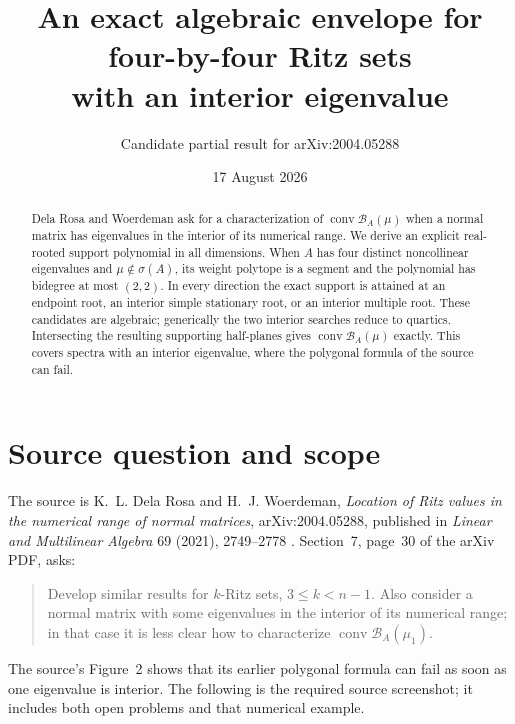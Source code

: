 \documentclass[11pt]{article}
\title{An exact algebraic envelope for four-by-four Ritz sets\\
with an interior eigenvalue}
\author{Candidate partial result for arXiv:2004.05288}
\date{17 August 2026}
\newcommand{\conv}{\operatorname{conv}}
\newcommand{\spec}{\sigma}
\newcommand{\cB}{\mathcal B}
\numberwithin{equation}{section}
\theoremstyle{definition}
\begin{document}
\maketitle

\begin{center}
\end{center}

\begin{abstract}
Dela Rosa and Woerdeman ask for a characterization of
$\conv\cB_A(\mu)$ when a normal matrix has eigenvalues in the interior of its
numerical range.  We derive an explicit real-rooted support polynomial in all
dimensions.  When $A$ has four distinct noncollinear eigenvalues and
$\mu\notin\spec(A)$, its weight polytope is a segment and the polynomial has
bidegree at most $(2,2)$.  In every direction the exact support is attained at
an endpoint root, an interior simple stationary root, or an interior multiple
root.  These candidates are algebraic; generically the two interior searches
reduce to quartics.  Intersecting the resulting supporting half-planes gives
$\conv\cB_A(\mu)$ exactly.  This covers spectra with an interior eigenvalue,
where the polygonal formula of the source can fail.
\end{abstract}

\section{Source question and scope}

The source is K.~L. Dela Rosa and H.~J. Woerdeman, \emph{Location of Ritz
values in the numerical range of normal matrices}, arXiv:2004.05288,
published in \emph{Linear and Multilinear Algebra} 69 (2021), 2749--2778
\cite{DRW-location}.  Section~7, page~30 of the arXiv PDF, asks:

\begin{quote}
Develop similar results for $k$-Ritz sets, $3\leq k<n-1$.  Also consider a
normal matrix with some eigenvalues in the interior of its numerical range;
in that case it is less clear how to characterize $\conv\cB_A(\mu_1)$.
\end{quote}

The source's Figure~2 shows that its earlier polygonal formula can fail as
soon as one eigenvalue is interior.  The following is the required source
screenshot; it includes both open problems and that numerical example.
\end{document}
